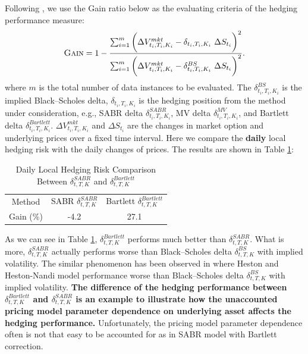 \documentclass[letterpaper,12pt,titlepage,oneside,final]{book}
\numberwithin{equation}{section}
\theoremstyle{definition}
\begin{document}
\begin{itemize}
    Following \cite{hulloptimal},  we use the Gain ratio below as the evaluating criteria of the hedging performance measure:
    \begin{equation}
    \textsc{Gain}=1-\frac{\sum_{i=1}^m \bigg(\Delta V^{mkt}_{t_i,T_i,K_i}-\delta_{t_i,T_i,K_i} ~ \Delta S_{t_i} \bigg)^2}{\sum_{i=1}^m \bigg(\Delta V^{mkt}_{t_i,T_i,K_i}-\delta^{BS}_{t_i,T_i,K_i} ~ \Delta S_{t_i} \bigg)^2}.
    \label{eq:Gain}
    \end{equation}
    where $m$ is the total number of data instances to be evaluated.  The $\delta^{BS}_{t_i,T_i,K_i}$ is the implied Black–Scholes delta, $\delta_{t_i,T_i,K_i}$  is the hedging position from the method under consideration,  e.g., SABR delta $\delta^{SABR}_{t_i,T_i,K_i}$,  MV delta $\delta^{MV}_{t_i,T_i,K_i}$, and  Bartlett delta $\delta^{Bartlett}_{t_i,T_i,K_i}$. $\Delta V^{mkt}_{t_i,T_i,K_i}$ and $\Delta S_{t_i}$
    are the changes in market option and underlying prices over a fixed time interval. Here we compare the \textbf{daily} local hedging risk with the daily changes of prices. The results are shown in Table \ref{table:Bartlett}:
    \begin{table}[htp!]
        \centering
        \begin{tabular}{|c|c|c|}
            \hline
            Method& SABR $\delta^{SABR}_{t,T,K}$ & Bartlett $\delta^{Bartlett}_{t,T,K}$\\
            Gain (\%) &-4.2 & 27.1 \\
            \hline
        \end{tabular}
        \caption{Daily Local Hedging Risk Comparison Between  $\delta^{SABR}_{t,T,K}$ and   $\delta^{Bartlett}_{t,T,K}$}
        \label{table:Bartlett}
    \end{table}
    As we can see in Table \ref{table:Bartlett}, $\delta^{Bartlett}_{t,T,K}$ performs much better than $\delta^{SABR}_{t,T,K}$. What is more, $\delta^{SABR}_{t,T,K}$ actually performs worse than Black–Scholes delta $\delta^{BS}_{t,T,K}$ with implied volatility. The similar phenomenon has been observed in \cite{lassance2018comparison} where Heston and Heston-Nandi model performance worse than Black–Scholes delta $\delta^{BS}_{t,T,K}$ with implied volatility.  \textbf{The difference of the hedging performance between $\delta^{Bartlett}_{t,T,K}$ and $\delta^{SABR}_{t,T,K}$ is an example to illustrate how the unaccounted  pricing model parameter dependence on underlying asset affects the hedging performance. }Unfortunately, the pricing model parameter dependence often is not that easy to be accounted for as in SABR model with Bartlett correction.
\end{itemize}
\end{document}

